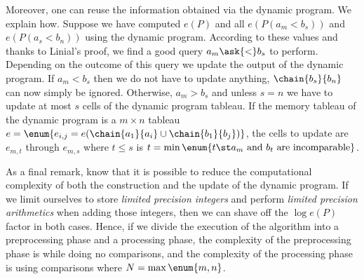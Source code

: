 Moreover, one can reuse the information obtained via the dynamic program. We
explain how. Suppose we have computed \(e(P)\) and all \(e(P(a_m < b_s))\) and
\(e(P(a_s < b_n))\) using the dynamic program. According to these values and
thanks to Linial's proof, we find a good query \(a_m \ask{<} b_s\) to perform.
Depending on the outcome of this query we update the output of the dynamic
program. If \(a_m < b_s\) then we do not have to update anything,
\(\chain{b_s}{b_n}\) can now simply be ignored. Otherwise, \(a_m > b_s\) and
unless \(s = n\) we have to update at most \(s\) cells of the dynamic program
tableau. If the memory tableau of the dynamic program is a \(m \times n\)
tableau \(e = \enum{e_{i,j} = e(\chain{a_1}{a_i} \cup \chain{b_1}{b_j})}\), the
cells to update are \(e_{m,t}\) through \(e_{m,s}\) where \(t \le s\) is \( t =
\min \enum{t \st a_m \text{ and } b_t \text{ are incomparable} }\).

As a final remark, know that it is possible to reduce the computational
complexity of both the construction and the update of the dynamic program. If
we limit ourselves to store \emph{limited precision integers} and perform
\emph{limited precision arithmetics} when adding those integers, then we can
shave off the \(\log e(P)\) factor in both cases. Hence, if we divide the
execution of the algorithm into a preprocessing phase and a processing phase,
the complexity of the preprocessing phase is  while doing no
comparisons, and the complexity of the processing phase is 
using  comparisons where \(N = \max \enum{m,n}\).
